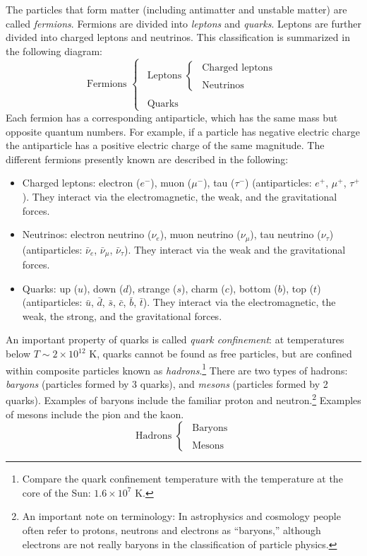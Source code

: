 \documentclass[11pt, a4paper,oneside,openright]{book}
\numberwithin{equation}{section}
\begin{document}
The particles that form matter (including antimatter and unstable matter) are called {\it fermions}. Fermions are divided into {\it leptons} and {\it quarks}. Leptons are further divided into charged leptons and neutrinos. This classification is summarized in the following diagram:
\begin{equation*}
\mbox{Fermions }\begin{cases} \mbox{$~~$Leptons } \begin{cases} \mbox{$~~$Charged leptons}\\ ~\\ \mbox{$~~$Neutrinos}\end{cases}\\ 
~\\
\mbox{$~~$Quarks} \end{cases}
\end{equation*}
Each fermion has a corresponding antiparticle, which has the same mass but opposite quantum numbers. For example, if a particle has negative electric charge the antiparticle has a positive electric charge of the same magnitude. The different fermions presently known are described in the following:
\begin{itemize}
\item Charged leptons: electron ($e^{-}$), muon ($\mu^{-}$), tau ($\tau^{-}$) (antiparticles: $e^{+}$, $\mu^{+}$, $\tau^{+}$). They interact via the electromagnetic, the weak, and the gravitational forces.
\item Neutrinos: electron neutrino ($\nu_e$), muon neutrino ($\nu_{\mu}$), tau neutrino ($\nu_{\tau}$) (antiparticles: $\bar{\nu}_e$, $\bar{\nu}_{\mu}$, $\bar{\nu}_{\tau}$). They interact via the weak and the gravitational forces.
\item Quarks: up ($u$), down ($d$), strange ($s$), charm ($c$), bottom ($b$), top ($t$) (antiparticles: $\bar{u}$, $\bar{d}$, $\bar{s}$, $\bar{c}$, $\bar{b}$, $\bar{t}$). They interact via the electromagnetic, the weak, the strong, and the gravitational forces.
\end{itemize}
An important property of quarks is called {\it quark confinement}: at temperatures below $T\sim 2\times10^{12}$ K, quarks cannot be found as free particles, but are confined within composite particles known as {\it hadrons}.\footnote{Compare the quark confinement temperature with the temperature at the core of the Sun: $1.6\times10^7$ K.} There are two types of hadrons: {\it baryons} (particles formed by 3 quarks), and {\it mesons} (particles formed by 2 quarks). Examples of baryons include the familiar proton and neutron.\footnote{An important note on terminology: In astrophysics and cosmology people often refer to protons, neutrons and electrons as ``baryons,'' although electrons are not really baryons in the classification of particle physics.} Examples of mesons include the pion and the kaon.
\begin{equation*}
\mbox{Hadrons }\begin{cases} \mbox{$~~$Baryons} \\ 
~\\
\mbox{$~~$Mesons} \end{cases}
\end{equation*}
\end{document}
